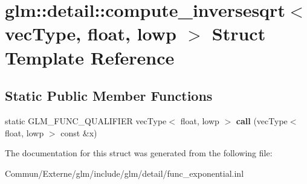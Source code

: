 \hypertarget{structglm_1_1detail_1_1compute__inversesqrt_3_01vec_type_00_01float_00_01lowp_01_4}{}\section{glm\+:\+:detail\+:\+:compute\+\_\+inversesqrt$<$ vec\+Type, float, lowp $>$ Struct Template Reference}
\label{structglm_1_1detail_1_1compute__inversesqrt_3_01vec_type_00_01float_00_01lowp_01_4}
\subsection*{Static Public Member Functions}
\begin{DoxyCompactItemize}
\item 
static G\+L\+M\+\_\+\+F\+U\+N\+C\+\_\+\+Q\+U\+A\+L\+I\+F\+I\+ER vec\+Type$<$ float, lowp $>$ {\bfseries call} (vec\+Type$<$ float, lowp $>$ const \&x)\hypertarget{structglm_1_1detail_1_1compute__inversesqrt_3_01vec_type_00_01float_00_01lowp_01_4_a943fd9690f6c1fcb7383bfbcde30c3fb}{}\label{structglm_1_1detail_1_1compute__inversesqrt_3_01vec_type_00_01float_00_01lowp_01_4_a943fd9690f6c1fcb7383bfbcde30c3fb}

\end{DoxyCompactItemize}


The documentation for this struct was generated from the following file\+:\begin{DoxyCompactItemize}
\item 
Commun/\+Externe/glm/include/glm/detail/func\+\_\+exponential.\+inl\end{DoxyCompactItemize}
